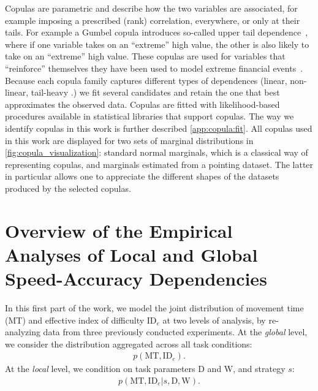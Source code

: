 \documentclass[acmlarge, manuscript,review]{acmart}
\newcommand{\mt}{\ensuremath{{\text{MT}}}\xspace}
\newcommand{\ide}{\ensuremath{{\text{ID}_e}}\xspace}
\newcommand{\D}{\ensuremath{{\text{D}}}\xspace}
\newcommand{\W}{\ensuremath{{\text{W}}}\xspace}
\begin{document}
Copulas are parametric and describe how the two variables are associated, for example imposing a prescribed (rank) correlation, everywhere, or only at their tails.
For example a Gumbel copula introduces so-called upper tail dependence~\cite{nelsen2006}, where if one variable takes on an ``extreme'' high value, the other is also likely to take on an ``extreme'' high value. These copulas are used for variables that ``reinforce'' themselves \eg they have been used to model extreme financial events~\cite{dewick2022}.
Because each copula family captures different types of dependences (linear, non-linear, tail-heavy \etc.) we fit several candidates and retain the one that best approximates the observed data. Copulas are fitted with likelihood-based procedures available in statistical libraries that support copulas.
The way we identify copulas in this work is further described \autoref{app:copula:fit}. All copulas used in this work are displayed for two sets of marginal distributions in \autoref{fig:copula_visualization}: standard normal marginals, which is a classical way of representing copulas, and marginals estimated from a pointing dataset. The latter in particular allows one to appreciate the different shapes of the datasets produced by the selected copulas.





\section{Overview of the Empirical Analyses of Local and Global Speed-Accuracy Dependencies\label{sec:outline}}
In this first part of the work, we model the joint distribution of movement time (MT) and effective index of difficulty \ide at two levels of analysis, by re-analyzing data from three previously conducted experiments.
At the \emph{global} level, we consider the distribution aggregated across all task conditions:
\begin{align}
	p(\mt, \ide). \label{eq:joint_global}
\end{align}
At the \emph{local} level, we condition on task parameters D and W, and strategy $s$:
\begin{align}
	p(\mt, \ide | s, \D, \W). \label{eq:joint_local}
\end{align}
\end{document}
